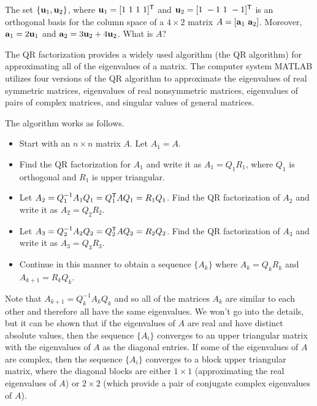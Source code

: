 \begin{activity} The set $\{\mathbf{u}_1, \mathbf{u}_2\}$, where $\mathbf{u}_1 =  [1 \ 1 \ 1 \ 1]^{\mathsf{T}}$ and $\mathbf{u}_2 = [1 \ -1 \ 1 \ -1]^{\mathsf{T}}$ is an orthogonal basis for the column space of a $4 \times 2$ matrix $A = [\mathbf{a}_1 \ \mathbf{a}_2]$. Moreover, $\mathbf{a}_1 = 2\mathbf{u}_1$ and $\mathbf{a}_2 = 3\mathbf{u}_2+4\mathbf{u}_2$. What is $A$? 
\end{activity}


The QR factorization provides a widely used algorithm (the QR algorithm) for approximating all of the eigenvalues of a matrix. The computer system MATLAB utilizes four versions of the QR algorithm to approximate the eigenvalues of real symmetric matrices, eigenvalues of real nonsymmetric matrices, eigenvalues of pairs of complex matrices, and singular values of general matrices. %

The algorithm works as follows.
\begin{itemize}
\item Start with an $n \times n$ matrix $A$. Let $A_1 = A$.
\item Find the QR factorization for $A_1$ and write it as $A_1 = Q_1R_1$, where $Q_1$ is orthogonal and $R_1$ is upper triangular.
\item Let $A_2 = Q_1^{-1}A_1Q_1 = Q_1^{\mathsf{T}}AQ_1 = R_1Q_1$. Find the QR factorization of $A_2$ and write it as $A_2 = Q_2R_2$.
\item Let $A_3 = Q_2^{-1}A_2Q_2 = Q_2^{\mathsf{T}}AQ_2 = R_2Q_2$. Find the QR factorization of $A_3$ and write it as $A_3 = Q_3R_3$.
\item Continue in this manner to obtain a sequence $\{A_k\}$ where $A_k = Q_kR_k$ and $A_{k+1} = R_kQ_k$.
\end{itemize}
Note that $A_{k+1} = Q_k^{-1}A_kQ_k$ and so all of the matrices $A_k$ are similar to each other and therefore all have the same eigenvalues. We won't go into the details, but it can be shown that if the eigenvalues of $A$ are real and have distinct absolute values, then the sequence $\{A_i\}$ converges to an upper triangular matrix with the eigenvalues of $A$ as the diagonal entries. If some of the eigenvalues of $A$ are complex, then the sequence $\{A_i\}$ converges to a block upper triangular matrix, where the diagonal blocks are either $1 \times 1$ (approximating the real eigenvalues of $A$) or $2 \times 2$ (which provide a pair of conjugate complex eigenvalues of $A$).


